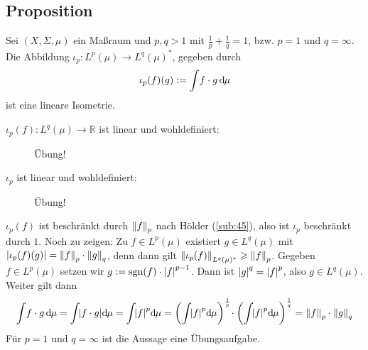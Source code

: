 \subsection[Proposition: Lineare Isometrie $\iota_p \colon L^p(\mu) \to L^q(\mu)^*$]{Proposition} %
\label{sub:410}
Sei $(X,\Sigma,\mu)$ ein Maßraum und $p,q >1$ mit $\frac{1}{p} + \frac{1}{q}=1$, bzw. $p=1$ und $q=\infty$. 
Die Abbildung $\iota_p \colon L^p(\mu) \to L^q(\mu)^*$, gegeben 
durch
\[
	\iota_p(f)(g) := \int \! f \cdot g \, \mathd \mu
\]
ist eine lineare Isometrie.
\begin{description}
	\item[$\iota_p(f) \colon L^q(\mu) \to \mathds{R}$ ist linear und wohldefiniert:] Übung!
	\item[$\iota_p$ ist linear und wohldefiniert:] Übung!
\end{description}
$\iota_p(f)$ ist beschränkt durch $\norm[p]{f}$ nach Hölder (\ref{sub:45}), also ist $\iota_p$ beschränkt durch $1$. Noch zu zeigen: Zu $f \in L^p(\mu)$ existiert 
$g \in L^q(\mu)$ mit $\abs*{\iota_p(f)(g)} = \norm[p]{f} \cdot \norm[q]{g}$, denn dann gilt $\norm[L^q(\mu)^*]{\iota_p(f)}  \ge \norm[p]{f}$.
Gegeben $f \in L^p(\mu)$ setzen wir $g := \sgn(f) \cdot \abs*{f}^{p-1}$. Dann ist $\abs*{g}^q= \abs*{f}^p$, also $g \in L^q(\mu)$. Weiter gilt dann
\begin{align*}
	\int \!f \cdot g \,\mathd \mu = \int \! \abs*{f \cdot g} \mathd \mu = \int \!\abs*{f}^p \mathd \mu  = \enbrace*{\int\! \abs*{f}^p \mathd \mu }^{\frac{1}{p}}
	\!\cdot  \enbrace*{\int \!  \abs*{f}^p \mathd\mu}^{\frac{1}{q}} = \norm[p]{f} \cdot \norm[q]{g}    
\end{align*}
Für $p=1$ und $q=\infty$ ist die Aussage eine Übungsaufgabe. \bewende


